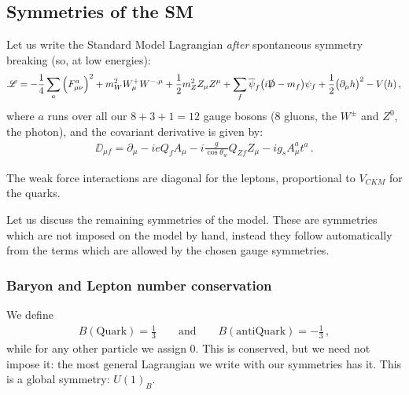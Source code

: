 \documentclass[main.tex]{subfiles}
\begin{document}
\subsection{Symmetries of the SM}


Let us write the Standard Model Lagrangian \emph{after} spontaneous symmetry breaking (so, at low energies): 
%
\begin{align}
\mathscr{L} = - \frac{1}{4} \sum _{a} \qty(F_{\mu \nu }^{a})^2
+ m_W^2 W^{+}_{\mu } W^{-, \mu }
+ \frac{1}{2} m_Z^2 Z_{\mu } Z^{\mu }
+ \sum _{f} \overline{\psi}_{f} \qty(i \slashed{\mathrm{D}} - m_f) \psi_{f} 
+ \frac{1}{2} \qty(\partial_{\mu } h)^2 - V(h)
\,,
\end{align}
%
where \(a\) runs over all our \(8 + 3 + 1 = 12\) gauge bosons (8 gluons, the \(W^{\pm }\) and \(Z^{0}\), the photon), and the covariant derivative is given by: 
%
\begin{align}
\DD_{\mu f} = \partial_{\mu } - i e Q_f A_{\mu } 
- i \frac{g}{\cos \theta_{w}} Q_{Zf} Z_{\mu } 
- i g_s A^{a}_{\mu } t^{a}
\,.
\end{align}


The weak force interactions are diagonal for the leptons, proportional to \(V_{CKM}\) for the quarks.

Let us discuss the remaining symmetries of the model. 
These are symmetries which are not imposed on the model by hand, instead they follow automatically from the terms which are allowed by the chosen gauge symmetries.

\subsubsection{Baryon and Lepton number conservation}

We define 
%
\begin{align}
B(\text{Quark}) = \frac{1}{3} \qquad \text{and} \qquad
B(\text{antiQuark}) = - \frac{1}{3}
\,,
\end{align}
%
while for any other particle we assign 0.
This is conserved, but we need not impose it: the most general Lagrangian we write with our symmetries has it.
This is a global symmetry: \(U(1)_{B}\). 
\end{document}
